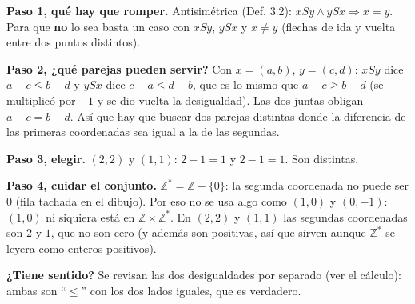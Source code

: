 \documentclass[11pt]{article}
\begin{document}
\begin{center}
\end{center}


\begin{explica}
\textbf{Paso 1, qué hay que romper.} Antisimétrica (Def. 3.2): $xSy\wedge ySx\Rightarrow x=y$. Para que \textbf{no} lo sea basta un caso con $xSy$, $ySx$ y $x\neq y$ (flechas de ida y vuelta entre dos puntos distintos).

\textbf{Paso 2, ¿qué parejas pueden servir?} Con $x=(a,b)$, $y=(c,d)$: $xSy$ dice $a-c\le b-d$ y $ySx$ dice $c-a\le d-b$, que es lo mismo que $a-c\ge b-d$ (se multiplicó por $-1$ y se dio vuelta la desigualdad). Las dos juntas obligan $a-c=b-d$. Así que hay que buscar dos parejas distintas donde la diferencia de las primeras coordenadas sea igual a la de las segundas.

\textbf{Paso 3, elegir.} $(2,2)$ y $(1,1)$: $2-1=1$ y $2-1=1$. Son distintas.

\textbf{Paso 4, cuidar el conjunto.} $\mathbb Z^*=\mathbb Z-\{0\}$: la segunda coordenada no puede ser $0$ (fila tachada en el dibujo). Por eso no se usa algo como $(1,0)$ y $(0,-1)$: $(1,0)$ ni siquiera está en $\mathbb Z\times\mathbb Z^*$. En $(2,2)$ y $(1,1)$ las segundas coordenadas son $2$ y $1$, que no son cero (y además son positivas, así que sirven aunque $\mathbb Z^*$ se leyera como enteros positivos).

\textbf{¿Tiene sentido?} Se revisan las dos desigualdades por separado (ver el cálculo): ambas son ``$\le$'' con los dos lados iguales, que es verdadero.
\end{explica}
\end{document}
